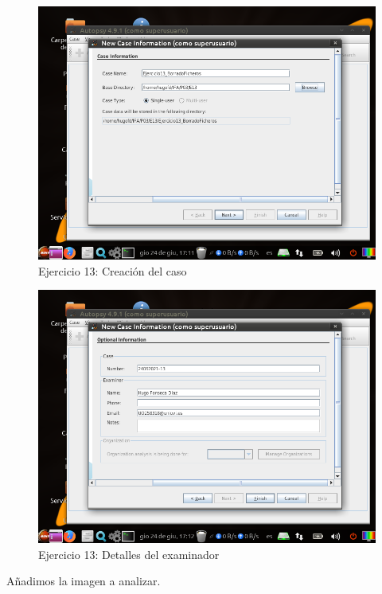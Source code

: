 \documentclass[11pt]{article}
\begin{document}
\begin{figure}[H]
    \caption{Ejercicio 13: Creación del caso}
    \centering
    \includegraphics[scale=0.7]{p03/e13-1.png}
\end{figure}

\begin{figure}[H]
    \caption{Ejercicio 13: Detalles del examinador}
    \centering
    \includegraphics[scale=0.7]{p03/e13-2.png}
\end{figure}

Añadimos la imagen a analizar.
\end{document}
